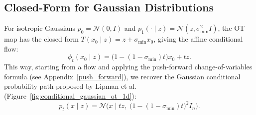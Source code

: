 \subsection{Closed-Form for Gaussian Distributions}

For isotropic Gaussians $p_0 = \mathcal{N}(0, I)$ and $p_1(\cdot \mid z) = \mathcal{N}(z, \sigma_{\min}^2 I)$, the OT map has the closed form $T(x_0 \mid z) = z + \sigma_{\min} x_0$, giving the affine conditional flow:
\begin{equation}
    \phi_t(x_0 \mid z) = \big(1 - (1 - \sigma_{\min})t\big) x_0 + t z.
\end{equation}
This way, starting from a flow and applying the push-forward change-of-variables formula (see Appendix~\ref{push_forward}), we recover the Gaussian conditional probability path proposed by Lipman et al.~\cite{lipman2023flow} (Figure~\ref{fig:conditional_gaussian_ot_1d}):
\begin{equation}
    p_t(x \mid z) = \mathcal{N}\Big(x \;\Big|\; t z, \; \big(1 - (1 - \sigma_{\min})t\big)^2 I_n\Big).
\end{equation}

